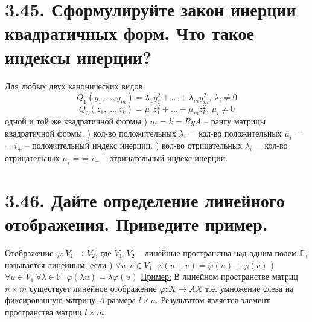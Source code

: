 \documentclass{article}
\begin{document}
\section*{\LARGE 3.45. Сформулируйте закон инерции квадратичных форм. Что такое индексы инерции?}
Для любых двух канонических видов 
$$ Q_1(y_1, ..., y_m) = \lambda_1y_1^2 + ... + \lambda_my_m^2,\, \lambda_i \ne 0$$
$$ Q_2(z_1, ..., z_k) = \mu_1z_1^2 + ... + \mu_mz_k^2,\, \mu_i \ne 0$$
одной и той же квадратичной формы
\newline{}) $m = k = RgA$ -- рангу матрицы квадратичной формы.
\newline{}) кол-во положительных $\lambda_i$ = кол-во положительных $\mu_i$ = 
\newline \indent = $i_+$ -- положительный индекс инерции.
\newline{}) кол-во отрицательных $\lambda_i$ = кол-во отрицательных $\mu_i$ = 
\newline \indent = $i_-$ -- отрицательный индекс инерции.

\section*{\LARGE 3.46. Дайте определение линейного отображения. Приведите пример.}
Отображение $\varphi : V_1 \rightarrow V_2$, где $V_1, V_2$ -- линейные пространства над одним полем $\mathbb{F}$, называется линейным, если
\newline{}) $\forall u,v \in V_1 \;\; \varphi(u + v) = \varphi(u) + \varphi(v)$
\newline{}) $\forall u \in V_1\:\forall \lambda \in \mathbb{F} \;\; \varphi(\lambda u) = \lambda \varphi(u)$
\newline \underline{Пример:}
\newline В линейном пространстве матриц $n \times m$ существует линейное отображение 
\newline $\varphi : X \rightarrow AX$ т.е. умножение слева на фиксированную матрицу $A$ размера $l \times n$. Результатом является элемент пространства матриц $l \times m$.

\end{document}
